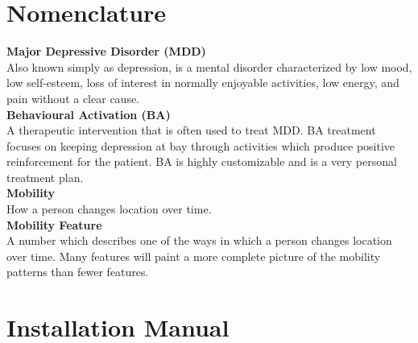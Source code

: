 
\chapter{Nomenclature}
\begin{acronym}[TDMA]
\end{acronym}

\textbf{Major Depressive Disorder (MDD)}\\
Also known simply as depression, is a mental disorder characterized by low mood, low self-esteem, loss of interest in normally enjoyable activities, low energy, and pain without a clear cause.\\

\textbf{Behavioural Activation (BA)}\\
A therapeutic intervention that is often used to treat MDD. BA treatment focuses on keeping depression at bay through activities which produce positive reinforcement for the patient. BA is highly customizable and is a very personal treatment plan.\\

\textbf{Mobility}\\
How a person changes location over time.\\

\textbf{Mobility Feature}\\
A number which describes one of the ways in which a person changes location over time. Many features will paint a more complete picture of the mobility patterns than fewer features.\\



\chapter{Installation Manual}
\label{appendix:installation}


